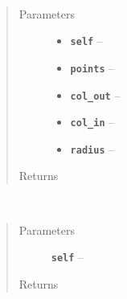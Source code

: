 \documentclass[letterpaper,10pt,english]{sphinxmanual}
\begin{document}
\begin{fulllineitems}

\begin{fulllineitems}
\label{RRtoolbox.lib:RRtoolbox.lib.image.GetCoors.drawstats}~\begin{quote}\begin{description}
\item[{Parameters}] \leavevmode\begin{itemize}
\item {} 
\textbf{\texttt{self}} -- 

\item {} 
\textbf{\texttt{points}} -- 

\item {} 
\textbf{\texttt{col\_out}} -- 

\item {} 
\textbf{\texttt{col\_in}} -- 

\item {} 
\textbf{\texttt{radius}} -- 

\end{itemize}

\item[{Returns}] \leavevmode


\end{description}\end{quote}

\end{fulllineitems}


\begin{fulllineitems}
\label{RRtoolbox.lib:RRtoolbox.lib.image.GetCoors.mousefunc}~\begin{quote}\begin{description}
\item[{Parameters}] \leavevmode
\textbf{\texttt{self}} -- 

\item[{Returns}] \leavevmode


\end{description}\end{quote}

\end{fulllineitems}



\end{fulllineitems}
\end{document}
